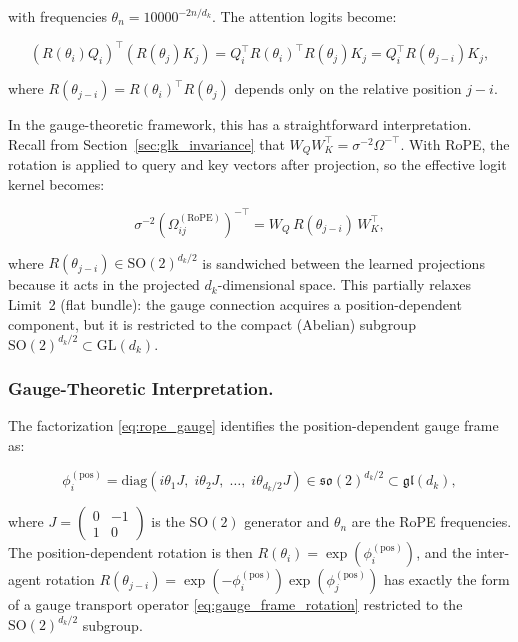 \documentclass[twoside,11pt]{article}
\begin{document}
with frequencies $\theta_n = 10000^{-2n/d_k}$. The attention logits become:

\begin{equation}
(R(\theta_i) Q_i)^\top (R(\theta_j) K_j) = Q_i^\top R(\theta_i)^\top R(\theta_j) K_j = Q_i^\top R(\theta_{j-i}) K_j,
\label{eq:rope_relative}
\end{equation}

where $R(\theta_{j-i}) = R(\theta_i)^\top R(\theta_j)$ depends only on the relative position $j - i$.

In the gauge-theoretic framework, this has a straightforward interpretation. Recall from Section~\ref{sec:glk_invariance} that $W_Q W_K^\top = \sigma^{-2}\Omega^{-\top}$. With RoPE, the rotation is applied to query and key vectors after projection, so the effective logit kernel becomes:

\begin{equation}
\sigma^{-2}(\Omega_{ij}^{(\mathrm{RoPE})})^{-\top} = W_Q\, R(\theta_{j-i})\, W_K^\top,
\label{eq:rope_gauge}
\end{equation}

where $R(\theta_{j-i}) \in \mathrm{SO}(2)^{d_k/2}$ is sandwiched between the learned projections because it acts in the projected $d_k$-dimensional space. This partially relaxes Limit~2 (flat bundle): the gauge connection acquires a position-dependent component, but it is restricted to the compact (Abelian) subgroup $\mathrm{SO}(2)^{d_k/2} \subset \mathrm{GL}(d_k)$.

\subsubsection{Gauge-Theoretic Interpretation.}

The factorization \eqref{eq:rope_gauge} identifies the position-dependent gauge frame as:

\begin{equation}
\phi_i^{(\mathrm{pos})} = \mathrm{diag}(i\theta_1 J, \; i\theta_2 J, \; \ldots, \; i\theta_{d_k/2} J) \in \mathfrak{so}(2)^{d_k/2} \subset \mathfrak{gl}(d_k),
\label{eq:rope_lie_algebra}
\end{equation}

where $J = \left(\begin{smallmatrix} 0 & -1 \\ 1 & 0 \end{smallmatrix}\right)$ is the $\mathrm{SO}(2)$ generator and $\theta_n$ are the RoPE frequencies. The position-dependent rotation is then $R(\theta_i) = \exp(\phi_i^{(\mathrm{pos})})$, and the inter-agent rotation $R(\theta_{j-i}) = \exp(-\phi_i^{(\mathrm{pos})})\exp(\phi_j^{(\mathrm{pos})})$ has exactly the form of a gauge transport operator \eqref{eq:gauge_frame_rotation} restricted to the $\mathrm{SO}(2)^{d_k/2}$ subgroup. 
\end{document}
